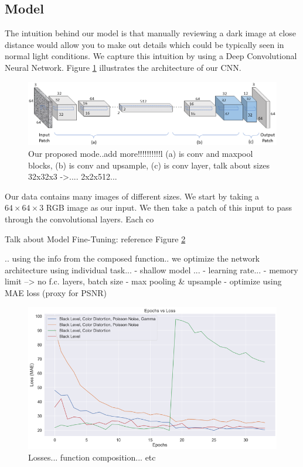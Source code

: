 \documentclass{article}
\begin{document}
\subsection{Model}

The intuition behind our model is that manually reviewing
a dark image at close distance would allow you to make out
details which could be typically seen in normal light 
conditions. We capture this intuition by using a Deep Convolutional Neural Network. Figure \ref{fig:model} illustrates the architecture of our CNN.

\begin{figure}[ht]
  \centering
  \includegraphics[scale=0.36]{model}
  \caption{Our proposed mode..add more!!!!!!!!!!l (a) is conv and maxpool blocks, (b) is conv and upsample, (c) is conv layer, talk about sizes 32x32x3 ->.... 2x2x512... }
  \label{fig:model}
\end{figure}

Our data contains many images of different sizes. We start by taking a $64 \times 64 \times 3$ RGB image as our input. We then take a patch of this input to pass through the convolutional layers. Each co


Talk about Model Fine-Tuning: reference Figure \ref{fig:losses_all_4}

.. using the info from the composed function..
we optimize the network architecture using individual task...
 - shallow model ...
 - learning rate...
 - memory limit --> no f.c. layers, batch size
 - max pooling & upsample
 - optimize using MAE loss (proxy for PSNR)


\begin{figure}[ht]
  \centering
  \includegraphics[scale=0.36]{losses_all_4}
  \caption{Losses... function composition... etc}
  \label{fig:losses_all_4}
\end{figure}
\end{document}
